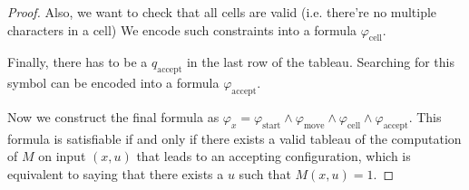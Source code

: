 \begin{proof}
	Also, we want to check that all cells are valid (i.e. there're no multiple characters in a cell) We encode such constraints into a formula $\varphi_{\text{cell}}$.

	Finally, there has to be a $q_{\text{accept}}$ in the last row of the tableau. Searching for this symbol can be encoded into a formula $\varphi_{\text{accept}}$.

	Now we construct the final formula as $\varphi_x = \varphi_{\text{start}} \wedge \varphi_{\text{move}} \wedge \varphi_{\text{cell}} \wedge \varphi_{\text{accept}}$. This formula is satisfiable if and only if there exists a valid tableau of the computation of $M$ on input $(x,u)$ that leads to an accepting configuration, which is equivalent to saying that there exists a $u$ such that $M(x,u) = 1$.

\end{proof}
